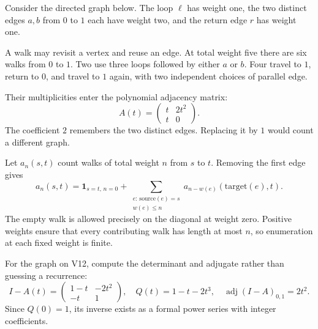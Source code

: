 
Consider the directed graph below. The loop $\ell$ has weight one, the two distinct edges $a,b$ from $0$ to $1$ each have weight two, and the return edge $r$ has weight one.


A walk may revisit a vertex and reuse an edge. At total weight five there are six walks from $0$ to $1$. Two use three loops followed by either $a$ or $b$. Four travel to $1$, return to $0$, and travel to $1$ again, with two independent choices of parallel edge.

Their multiplicities enter the polynomial adjacency matrix:
\[
A(t)=\begin{pmatrix}t&2t^2\\t&0\end{pmatrix}.
\]
The coefficient $2$ remembers the two distinct edges. Replacing it by $1$ would count a different graph.

Let $a_n(s,t)$ count walks of total weight $n$ from $s$ to $t$. Removing the first edge gives
\[
a_n(s,t)=\mathbf1_{s=t,\,n=0}
 +\sum_{\substack{e:\,\mathrm{source}(e)=s\\w(e)\le n}}
 a_{n-w(e)}(\mathrm{target}(e),t).
\]
The empty walk is allowed precisely on the diagonal at weight zero. Positive weights ensure that every contributing walk has length at most $n$, so enumeration at each fixed weight is finite.


For the graph on V12, compute the determinant and adjugate rather than guessing a recurrence:
\[
I-A(t)=\begin{pmatrix}1-t&-2t^2\\-t&1\end{pmatrix},
\quad Q(t)=1-t-2t^3,
\quad \operatorname{adj}(I-A)_{0,1}=2t^2.
\]
Since $Q(0)=1$, its inverse exists as a formal power series with integer coefficients.

